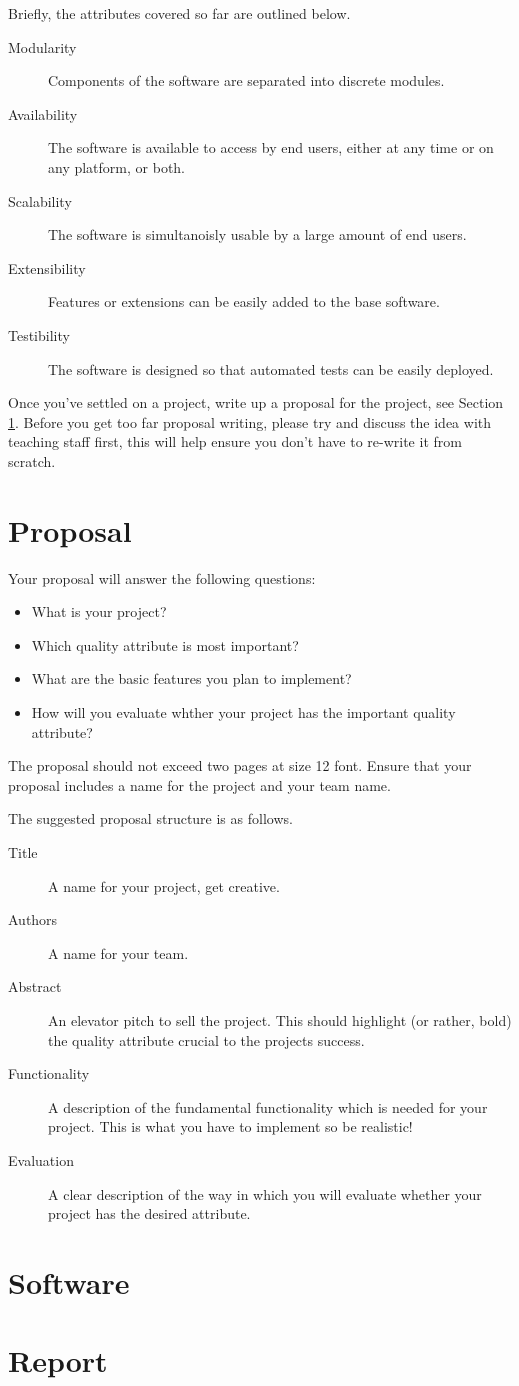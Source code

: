 \documentclass[12pt]{article}
\begin{document}
\clearpage\noindent
Briefly, the attributes covered so far are outlined below.
\begin{description}
    \item[Modularity] Components of the software are separated into discrete modules.
    \item[Availability] The software is available to access by end users, either at any time or on any platform, or both.
    \item[Scalability] The software is simultanoisly usable by a large amount of end users.
    \item[Extensibility] Features or extensions can be easily added to the base software.
    \item[Testibility] The software is designed so that automated tests can be easily deployed.
\end{description}

\noindent
Once you've settled on a project, write up a proposal for the project, see Section \ref{sect:proposal}.
Before you get too far proposal writing,
please try and discuss the idea with teaching staff first,
this will help ensure you don't have to re-write it from scratch.


\section{Proposal}\label{sect:proposal}
Your proposal will answer the following questions:
\begin{itemize}
    \item What is your project?
    \item Which quality attribute is most important?
    \item What are the basic features you plan to implement?
    \item How will you evaluate whther your project has the important quality attribute?
\end{itemize}

The proposal should not exceed two pages at size 12 font.
Ensure that your proposal includes a name for the project and your team name.

The suggested proposal structure is as follows.
\begin{description}
    \item[Title] A name for your project, get creative.
    \item[Authors] A name for your team.
    \item[Abstract] An elevator pitch to sell the project. This should highlight (or rather, bold) the quality attribute crucial to the projects success.
    \item[Functionality] A description of the fundamental functionality which is needed for your project. This is what you have to implement so be realistic!
    \item[Evaluation] A clear description of the way in which you will evaluate whether your project has the desired attribute.
\end{description}

\section{Software}

\section{Report}
\end{document}
